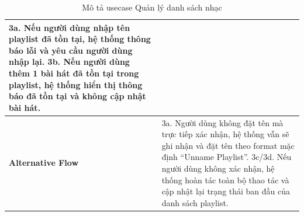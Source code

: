 \documentclass[a4paper]{article}
\begin{document}
\begin{table}[h!]
\begin{tabularx}{\textwidth}{|l|X|}
  3a. Nếu người dùng nhập tên playlist đã tồn tại, hệ thống thông báo lỗi và yêu cầu người dùng nhập lại. \newline
  3b. Nếu người dùng thêm 1 bài hát đã tồn tại trong playlist, hệ thống hiển thị thông báo đã tồn tại và không cập nhật bài hát. \\ \hline
\textbf{Alternative Flow} 
& 3a. Người dùng không đặt tên mà trực tiếp xác nhận, hệ thống vẫn sẽ ghi nhận và đặt tên theo format mặc định ``Unname Playlist''.\newline
  3c/3d. Nếu người dùng không xác nhận, hệ thống hoàn tác toàn bộ thao tác và cập nhật lại trạng thái ban đầu của danh sách playlist. \\ \hline
\end{tabularx}
\caption{Mô tả usecase Quản lý danh sách nhạc}
\end{table}
\end{document}
